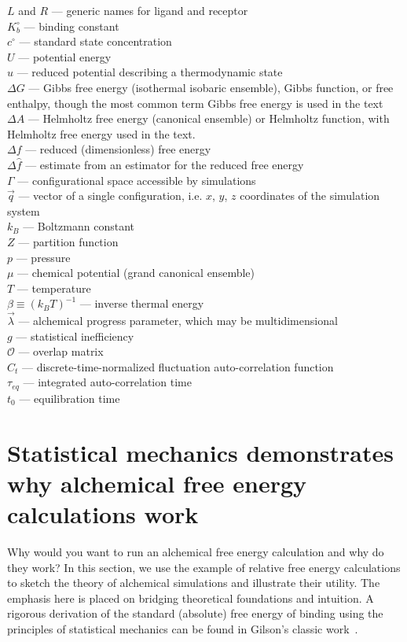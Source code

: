 \documentclass[9pt,bestpractices]{livecoms}
\begin{document}
\begin{tcolorbox}[title=List of Symbols, colback=green!10!white]
$L$ and $R$ --- generic names for ligand and receptor\\
$K_b^{\circ}$ --- binding  constant \\
$c^{\circ}$ --- standard state concentration \\
$U$ --- potential energy\\
$u$ --- reduced potential describing a thermodynamic state \\
$\Delta G$ --- Gibbs free energy (isothermal isobaric ensemble), Gibbs function, or free enthalpy, though the most common term Gibbs free energy is used in the text\\
$\Delta A$ --- Helmholtz free energy (canonical ensemble) or Helmholtz function, with Helmholtz free energy used in the text.\\
$\Delta f$ --- reduced (dimensionless) free energy \\
$\Delta \hat{f}$ --- estimate from an estimator for the reduced free energy\\
$\Gamma$ --- configurational space accessible by simulations \\
$\vec{q}$ --- vector of a single configuration, i.e. $x$, $y$, $z$ coordinates of the simulation system\\
$k_B$ --- Boltzmann constant \\
$Z$ --- partition function \\
$p$ --- pressure \\
$\mu$ --- chemical potential (grand canonical ensemble)\\
$T$ --- temperature \\
$\beta \equiv (k_B T)^{-1}$ --- inverse thermal energy \\
$\vec{\lambda}$ --- alchemical progress parameter, which may be multidimensional \\
$g$ --- statistical inefficiency\\
$\mathcal{O}$ --- overlap matrix\\
$C_t$ --- discrete-time-normalized fluctuation auto-correlation function\\
$\tau _{eq}$ --- integrated auto-correlation time\\
$t_0$ --- equilibration time
\end{tcolorbox}

\section{Statistical mechanics demonstrates why alchemical free energy calculations work}
\label{sec:theory}
Why would you want to run an alchemical free energy calculation and why do they work?
In this section, we use the example of relative free energy calculations to sketch the theory of alchemical simulations and illustrate their utility.
The emphasis here is placed on bridging theoretical foundations and intuition.
A rigorous derivation of the standard (absolute) free energy of binding using the principles of statistical mechanics can be found in Gilson's classic work~\cite{gilson1997statisticalthermodynamic}.
\end{document}
